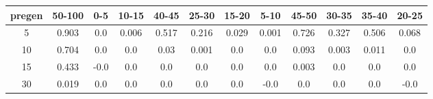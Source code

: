 \documentclass{article}
\begin{document}
\begin{tabular}{c|ccccccccccc}
pregen&50-100&0-5&10-15&40-45&25-30&15-20&5-10&45-50&30-35&35-40&20-25\\
\hline
5&0.903&0.0&0.006&0.517&0.216&0.029&0.001&0.726&0.327&0.506&0.068\\
10&0.704&0.0&0.0&0.03&0.001&0.0&0.0&0.093&0.003&0.011&0.0\\
15&0.433&-0.0&0.0&0.0&0.0&0.0&0.0&0.003&0.0&0.0&0.0\\
30&0.019&0.0&0.0&0.0&0.0&0.0&-0.0&0.0&0.0&0.0&-0.0\\

\end{tabular}
\end{document}
